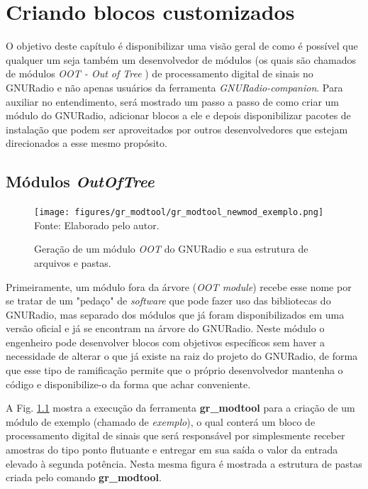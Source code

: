 \documentclass[
  12pt,				%
  openright,			%
  twoside,			%
  a4paper,			%
  english,			%
  french,				%
  spanish,			%
  brazil,				%
  ]{abntex2}
\begin{document}


\chapter{Criando blocos customizados}

O objetivo deste capítulo é disponibilizar uma visão geral de como é possível que qualquer um seja também um desenvolvedor de módulos (os quais são chamados de módulos \textit{OOT - Out of Tree} \cite{GNURADIO-oot-modules})
de processamento digital de sinais no GNURadio e não apenas usuários da ferramenta \textit{GNURadio-companion}. Para auxiliar no entendimento, será mostrado um passo a passo de como criar
um módulo do GNURadio, adicionar blocos a ele e depois disponibilizar pacotes de instalação que podem ser aproveitados por outros desenvolvedores que estejam direcionados a esse mesmo propósito.

\section*{Módulos \textit{OutOfTree}} \label{section:modules_oot}

\begin{figure}[!htb]
  \centering
  \caption{Geração de um módulo \textit{OOT} do GNURadio e sua estrutura de arquivos e pastas.}
  \texttt{[image: figures/gr\_modtool/gr\_modtool\_newmod\_exemplo.png]}
  Fonte: Elaborado pelo autor.
  \label{fig:gr_modtool_newmod_exemplo}
\end{figure}

Primeiramente, um módulo fora da árvore (\textit{OOT module}) recebe esse nome por se tratar de um "pedaço" de \textit{software} que pode fazer uso das bibliotecas do GNURadio, mas separado dos
módulos que já foram disponibilizados em uma versão oficial e já se encontram na árvore do GNURadio. Neste módulo o engenheiro pode desenvolver blocos com objetivos específicos sem haver a necessidade
de alterar o que já existe na raiz do projeto do GNURadio, de forma que esse tipo de ramificação permite que o próprio desenvolvedor mantenha o código e disponibilize-o da forma que achar conveniente.

A Fig. \ref{fig:gr_modtool_newmod_exemplo} mostra a execução da ferramenta \textbf{gr\_modtool} para a criação de um módulo de exemplo (chamado de \textit{exemplo}), o qual conterá um
bloco de processamento digital  de sinais que será responsável por simplesmente receber amostras do tipo ponto flutuante e entregar em sua saída o valor da entrada elevado à segunda potência.
Nesta mesma figura é mostrada a estrutura de pastas criada pelo comando \textbf{gr\_modtool}.
\end{document}
